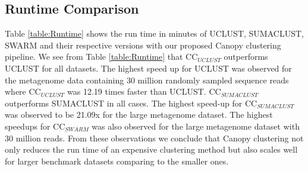 \documentclass[10pt, conference, compsocconf]{IEEEtran}
\begin{document}
\subsection{\textbf{Runtime Comparison}} Table \ref{table:Runtime} shows the run time in minutes of UCLUST, SUMACLUST, SWARM and their respective versions with our proposed Canopy clustering pipeline. We see from Table \ref{table:Runtime} that CC$_{UCLUST}$ outperforms UCLUST for all datasets. The highest speed up for UCLUST was observed for the metagenome data containing 30 million randomly sampled sequence reads where CC$_{UCLUST}$ was 12.19 times faster than UCLUST. CC$_{SUMACLUST}$ outperforms SUMACLUST in all cases. The highest speed-up for CC$_{SUMACLUST}$ was observed to be 21.09x for the large metagenome dataset. The highest speedups for CC$_{SWARM}$ was also observed for the large metagenome dataset with 30 million reads. From these observations we conclude that Canopy clustering not only reduces the run time of an expensive clustering method but also scales well for larger benchmark datasets comparing to the smaller ones.   
\end{document}
